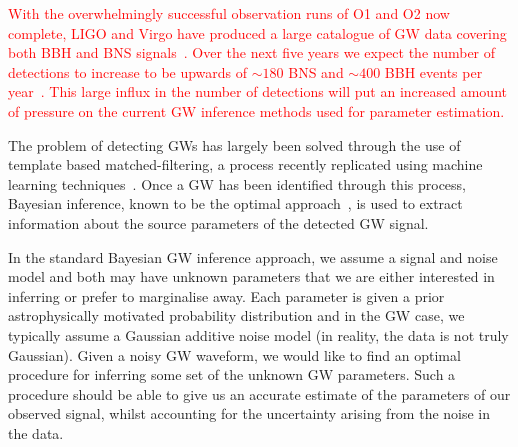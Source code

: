 %
%
%
\textcolor{red}{
With the overwhelmingly successful observation runs of O1 and O2 now complete,
\ac{LIGO} and Virgo have produced a large catalogue of \ac{GW} data covering
both \ac{BBH} and \ac{BNS} signals~\cite{1811.12907}. Over the next five years
we expect the number of detections to increase to be upwards of $\sim180$
\ac{BNS} and $\sim400$ BBH events per year~\cite{1304.0670,1811.12907}. This
large influx in the number of detections will put an increased amount of
pressure on the current \ac{GW} inference methods used for parameter
estimation.}  

%
%
The problem of detecting \acp{GW} has largely been solved through the use of
template based matched-filtering, a process recently replicated using machine
learning techniques~\cite{GEORGE201864,PhysRevLett.120.141103,GebKilParHarSch}.
Once a \ac{GW} has been identified through this process, Bayesian inference,
known to be the optimal approach~\cite{2009CQGra..26o5017S}, is used to extract
information about the source parameters of the detected \ac{GW} signal.

%
%
In the standard Bayesian \ac{GW} inference approach, we assume a signal and
noise model and both may have unknown parameters that we are either interested
in inferring or prefer to marginalise away. Each parameter is given a prior
astrophysically motivated probability distribution and in the \ac{GW} case, we
typically assume a Gaussian additive noise model (in reality, the data is not
truly Gaussian). Given a noisy \ac{GW} waveform, we would like to find an
optimal procedure for inferring some set of the unknown \ac{GW} parameters.
Such a procedure should be able to give us an accurate estimate of the
parameters of our observed signal, whilst accounting for the uncertainty
arising from the noise in the data.

